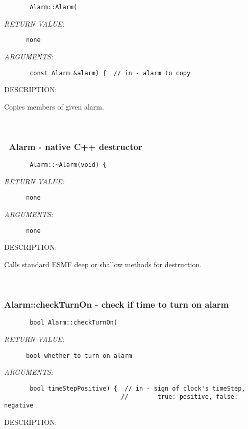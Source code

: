   
\begin{verbatim}       Alarm::Alarm(\end{verbatim}{\em RETURN VALUE:}
\begin{verbatim}      none\end{verbatim}{\em ARGUMENTS:}
\begin{verbatim}       const Alarm &alarm) {  // in - alarm to copy\end{verbatim}
{\sf DESCRIPTION:\\ }


        Copies members of given alarm.
   
 
\mbox{}\hrulefill\ 
 
\subsubsection [~Alarm] {~Alarm - native C++ destructor}


  
\begin{verbatim}       Alarm::~Alarm(void) {\end{verbatim}{\em RETURN VALUE:}
\begin{verbatim}      none\end{verbatim}{\em ARGUMENTS:}
\begin{verbatim}      none\end{verbatim}
{\sf DESCRIPTION:\\ }


        Calls standard ESMF deep or shallow methods for destruction.
   
 
\mbox{}\hrulefill\
 
\subsubsection [Alarm::checkTurnOn] {Alarm::checkTurnOn - check if time to turn on alarm}


  
\begin{verbatim}       bool Alarm::checkTurnOn(\end{verbatim}{\em RETURN VALUE:}
\begin{verbatim}      bool whether to turn on alarm\end{verbatim}{\em ARGUMENTS:}
\begin{verbatim}       bool timeStepPositive) {  // in - sign of clock's timeStep,
                                //        true: positive, false: negative\end{verbatim}
{\sf DESCRIPTION:\\ }


